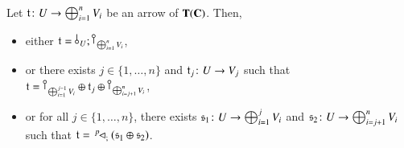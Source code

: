 \begin{lemma}\label{lemma:division}
Let $\mathfrak{t} \colon U \to \bigoplus_{i=1}^n V_i$ be an arrow of $\mathbf{T}(\mathbf{C})$. Then, 
\begin{itemize}
\item either $\t= \bang{U}; \cobang{\bigoplus_{i=1}^n V_i}$,
\item or there exists $j\in \{1,\dots, n\}$ and $\mathfrak{t}_j \colon U \to V_j$ such that $\t = \cobang{\bigoplus_{i=1}^{j-1} V_i} \oplus \t_j \oplus \cobang{\bigoplus_{i=j+1}^{n} V_i}$,
\item or for all $j\in \{1,\dots, n\}$, there exists $\mathfrak{s}_1\colon U \to \bigoplus_{i=1}^{j} V_i$ and $\mathfrak{s}_2 \colon U \to \bigoplus_{i=j+1}^{n} V_i$ such that $\mathfrak{t}=\,^p\!\! \lhd_{;} (\mathfrak{s}_1\oplus \mathfrak{s}_2)$.
\end{itemize}
\end{lemma}
